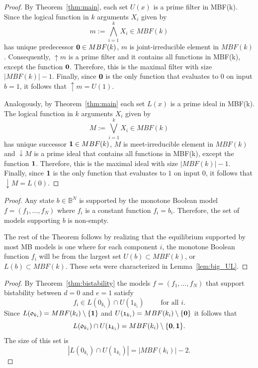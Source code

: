 \documentclass[10pt,letterpaper]{article}
\newcommand{\bbB}{\mathbb{B}}
\newcommand{\boolf}{{\mathfrak 0}}
\newcommand{\boolt}{{\mathfrak 1}}
\newcommand{\bzero}{{\bf 0}}
\newcommand{\bone}{{\bf 1}}
\begin{document}
\vskip0.3in
\begin{proof}
By Theorem~\ref{thm:main}, each set $U(x)$ is a prime filter in MBF(k).
Since the logical function in $k$ arguments $X_i$
given by 
\[ m:= \bigwedge_{i=1}^k X_i \in MBF(k) \]
has unique predecessor $\bzero \in MBF(k)$, $m$ is joint-irreducible element in $MBF(k)$.
Consequently, $\uparrow m$ is a prime filter and it contains all functions in MBF(k), except the function $\bzero$. Therefore, this is the maximal filter with size $|MBF(k)|-1$. Finally, since $\bzero$ is the only function that evaluates to $0$ on input $b = \boolt$, it follows that $\uparrow m = U(\boolt)$. 

Analogously, by Theorem~\ref{thm:main} each set $L(x)$ is a prime ideal in MBF(k). The logical function in $k$ arguments $X_i$
given by 
\[ M:= \bigvee_{i=1}^k X_i \in MBF(k) \]
has unique successor $\bone \in MBF(k)$, $M$ is meet-irreducible element in $MBF(k)$ and $\downarrow M$ is a prime ideal that contains all functions in MBF(k), except the function $\bone$. Therefore, this is the maximal ideal with size $|MBF(k)|-1$. Finally, since $\bone$ is the only function that evaluates to $1$ on input $\boolf$, it follows that $\downarrow M = L(\boolf)$. 

\end{proof}
\vskip0.2in


\begin{proof}
Any state $b\in \bbB^N$ is supported by the monotone Boolean model 
$f=(f_1, \ldots, f_N)$ where $f_i$ is a constant function $f_i=b_i$. Therefore, the set of models supporting $b$ is non-empty.

The rest of the Theorem follows by realizing that the equilibrium supported by most MB models is one where for each component $i$, the monotone Boolean function $f_i$ will be from the largest set $U(b)\subset MBF(k)$, or $L(b)\subset MBF(k)$. These sets were characterized in Lemma~\ref{lem:big_UL}.

\end{proof}
\vskip0.2in

\begin{proof} 
By Theorem~\ref{thm:bistability} the models $f=(f_1, \ldots, f_N)$ 
that support bistability between $d=\boolf$ and $e=\boolt$ satisfy 
\[ f_i \in L(\boolf_{k_i}) \cap U(\boolt_{k_i}) \qquad \mbox{ for all } i.\]
Since $L(\boolf_{k_i}) = MBF(k_i)\setminus \{ \bone\} $ and $U(\boolt_{k_i}) = MBF(k_i)\setminus \{ \bzero\} $ it follows that 
\[ L(\boolf_{k_i}) \cap U(\boolt_{k_i}) = MBF(k_i)\setminus \{ \bzero, \bone\}. \]
The size of this set is
\[ |L(\boolf_{k_i}) \cap U(\boolt_{k_i})| = |MBF(k_i)|-2.\]
\end{proof}
\end{document}
